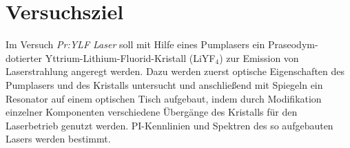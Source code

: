 \section{Versuchsziel}

Im Versuch \emph{Pr:YLF Laser} soll mit Hilfe eines Pumplasers ein Praseodym-dotierter
Yttrium-Lithium-Fluorid-Kristall (LiYF$_4$) zur Emission von Laserstrahlung angeregt werden.
Dazu werden zuerst optische Eigenschaften des Pumplasers und des Kristalls untersucht und
anschließend mit Spiegeln ein Resonator auf einem optischen Tisch aufgebaut,
indem durch Modifikation einzelner Komponenten verschiedene Übergänge des Kristalls für den
Laserbetrieb genutzt werden.
PI-Kennlinien und Spektren des so aufgebauten Lasers werden bestimmt.
